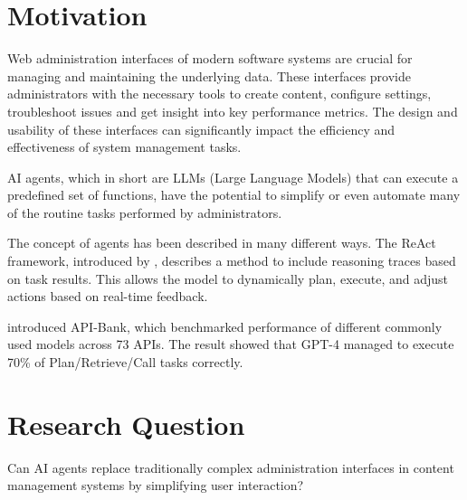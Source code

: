 \documentclass[12pt,a4paper]{article}
\title{\titlename}
\author{ \authorname\\ \scriptsize \authormail \\ \scriptsize \address }
\date{\exposedate}
\begin{document}

\maketitle

\section*{Motivation}
Web administration interfaces of modern software systems are crucial for managing and maintaining the underlying data. These interfaces provide administrators with the necessary tools to create content, configure settings, troubleshoot issues and get insight into key performance metrics. The design and usability of these interfaces can significantly impact the efficiency and effectiveness of system management tasks.

AI agents, which in short are LLMs (Large Language Models) that can execute a predefined set of functions, have the potential to simplify or even automate many of the routine tasks performed by administrators.


The concept of agents has been described in many different ways. The ReAct framework, introduced by \cite{yao_react_2023}, describes a method to include reasoning traces based on task results. This allows the model to dynamically plan, execute, and adjust actions based on real-time feedback.

\cite{li_api-bank_2023} introduced API-Bank, which benchmarked performance of different commonly used models across 73 APIs. The result showed that GPT-4 \autocite{openai_gpt-4_2024} managed to execute 70\% of Plan/Retrieve/Call tasks correctly.

\section*{Research Question}
Can AI agents replace traditionally complex administration interfaces in content management systems by simplifying user interaction?
\end{document}
